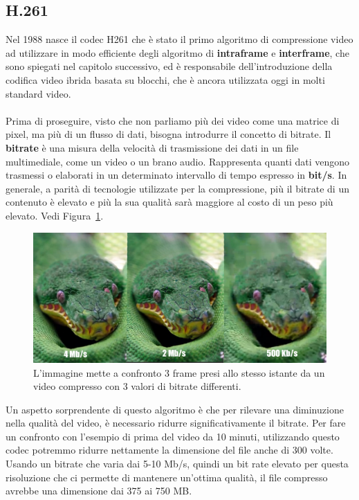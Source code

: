 \documentclass[a4paper,12pt, oneside]{article}
\begin{document}
\subsection{H.261}
Nel 1988 nasce il codec H261 che è stato il primo algoritmo di compressione video ad utilizzare
in modo efficiente degli algoritmo di \textbf{intraframe} e \textbf{interframe}, che sono
spiegati nel capitolo successivo, ed è responsabile dell'introduzione della codifica video
ibrida basata su blocchi, che è ancora utilizzata oggi in molti standard video.
\\\\Prima di proseguire, visto che non parliamo più dei video come una matrice di pixel, ma più di
un flusso di dati, bisogna introdurre il concetto di bitrate.
Il \textbf{bitrate} è una misura della velocità di trasmissione dei dati in un file multimediale,
come un video o un brano audio. Rappresenta quanti dati vengono trasmessi o elaborati in un
determinato intervallo di tempo espresso in \textbf{bit/s}. In generale, a parità di tecnologie
utilizzate per la compressione, più il bitrate di un contenuto è elevato e più la sua qualità
sarà maggiore al costo di un peso più elevato. Vedi Figura~\ref{fig:confronto_bitrate}.

\begin{figure}[h]
    \centering
    \includegraphics[width=1\textwidth]{images/confronto-bitrate.png}
    \caption{L'immagine mette a confronto 3 frame presi allo stesso istante da un video compresso con 3 valori di bitrate differenti.}
    \label{fig:confronto_bitrate}
\end{figure}

\noindent Un aspetto sorprendente di questo algoritmo è che per rilevare una diminuzione nella qualità
del video, è necessario ridurre significativamente il bitrate. Per fare un confronto con l'esempio di
prima del video da 10 minuti, utilizzando questo codec potremmo ridurre nettamente la dimensione del
file anche di 300 volte. Usando un bitrate che varia dai 5-10 Mb/s, quindi un bit rate elevato per
questa risoluzione che ci permette di mantenere un'ottima qualità, il file compresso avrebbe una
dimensione dai 375 ai 750 MB.
\end{document}
